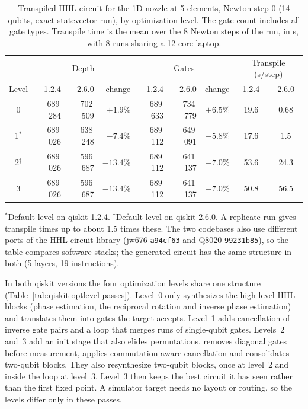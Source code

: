 \begin{table}[htbp]
\centering
\caption{Transpiled HHL circuit for the 1D nozzle at 5 elements, Newton step 0
(14 qubits, exact statevector run), by optimization level. The gate count
includes all gate types. Transpile time is the mean over the 8 Newton steps
of the run, in s, with 8 runs sharing a 12-core laptop.}
\label{tab:qiskit-optlevel-hhl}
\footnotesize
\begin{tabular}{c|rrr|rrr|cc}
\hline
 & \multicolumn{3}{c|}{Depth} & \multicolumn{3}{c|}{Gates}
 & \multicolumn{2}{c}{Transpile (s/step)} \\
Level & 1.2.4 & 2.6.0 & change & 1.2.4 & 2.6.0 & change & 1.2.4 & 2.6.0 \\
\hline
0 & 689\,284 & 702\,509 & $+1.9\%$ & 689\,633 & 734\,779 & $+6.5\%$
  & 19.6 & 0.68 \\
1$^{*}$ & 689\,026 & 638\,248 & $-7.4\%$ & 689\,112 & 649\,091 & $-5.8\%$
  & 17.6 & 1.5 \\
2$^{\dagger}$ & 689\,026 & 596\,687 & $-13.4\%$ & 689\,112 & 641\,137
  & $-7.0\%$ & 53.6 & 24.3 \\
3 & 689\,026 & 596\,687 & $-13.4\%$ & 689\,112 & 641\,137 & $-7.0\%$
  & 50.8 & 56.5 \\
\hline
\end{tabular}

\smallskip
\begin{minipage}{0.92\linewidth}
\footnotesize\raggedright
$^{*}$Default level on qiskit 1.2.4. $^{\dagger}$Default level on qiskit
2.6.0. A replicate run gives transpile times up to about 1.5 times these. The
two codebases also use different ports of the HHL circuit library (jw676
\texttt{a94cf63} and Q8020 \texttt{99231b85}), so the table compares software
stacks; the generated circuit has the same structure in both (5 layers, 19
instructions).
\end{minipage}
\end{table}

In both qiskit versions the four optimization levels share one structure
(Table~\ref{tab:qiskit-optlevel-passes}). Level~0 only synthesizes the
high-level HHL blocks (phase estimation, the reciprocal rotation and inverse
phase estimation) and translates them into gates the target accepts. Level~1
adds cancellation of inverse gate pairs and a loop that merges runs of
single-qubit gates. Levels~2 and~3 add an init stage that also elides
permutations, removes diagonal gates before measurement, applies
commutation-aware cancellation and consolidates two-qubit blocks. They also
resynthesize two-qubit blocks, once at level~2 and inside the loop at
level~3. Level~3 then keeps the best circuit it has seen rather than the first
fixed point. A simulator target needs no layout or routing, so the levels
differ only in these passes.


